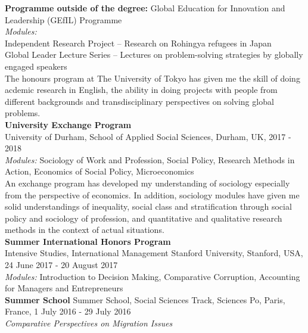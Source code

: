 \documentclass[11pt, a4paper]{article}
\begin{document}
\noindent \textbf{Programme outside of the degree:} Global Education for Innovation and Leadership (GEfIL) Programme \\
\textit{Modules:} \\
Independent Research Project – Research on Rohingya refugees in Japan \\
Global Leader Lecture Series – Lectures on problem-solving strategies by globally engaged speakers \\

\noindent The honours program at The University of Tokyo has given me the skill of doing acdemic research in English, the ability in doing projects with people from different backgrounds and transdisciplinary perspectives on solving global problems. \\

\noindent \textbf{University Exchange Program} \\
University of Durham, School of Applied Social Sciences, Durham, UK, 2017 - 2018 \\
\textit{Modules:} Sociology of Work and Profession, Social Policy, Research Methods in Action, Economics of Social Policy, Microeconomics \\

\noindent An exchange program has developed my understanding of sociology especially from the perspective of economics. In addition, sociology modules have given me solid understandings of inequality, social class and stratification through social policy and sociology of profession, and quantitative and qualitative research methods in the context of actual situations. \\

\noindent \textbf{Summer International Honors Program} \\
Intensive Studies, International Management Stanford University, Stanford, USA, 24 June 2017 - 20 August 2017 \\
\textit{Modules:} Introduction to Decision Making, Comparative Corruption, Accounting for Managers and Entrepreneurs \\

\noindent \textbf{Summer School} Summer School, Social Sciences Track, Sciences Po, Paris, France, 1 July 2016 - 29 July 2016 \\
\textit{Comparative Perspectives on Migration Issues} \\

\end{document}

